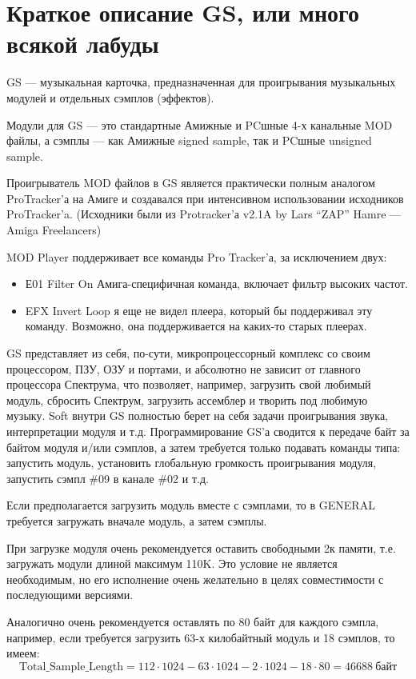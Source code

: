 \documentclass[a4paper,11pt]{article}
\begin{document}
\section{Краткое описание GS, или много всякой лабуды}
GS --- музыкальная карточка,  предназначенная для проигрывания  музыкальных модулей и отдельных сэмплов (эффектов).

Модули для GS --- это стандартные Амижные и PCшные 4-х канальные MOD файлы, а сэмплы --- как Амижные signed sample, так и PCшные unsigned sample.

Проигрыватель MOD  файлов  в  GS  является  практически  полным  аналогом ProTracker'а на Амиге и создавался при интенсивном  использовании  исходников ProTracker'a. (Исходники были из Protracker'а v2.1A by Lars ``ZAP'' Hamre --- Amiga Freelancers)

MOD Player поддерживает все команды Pro Tracker'а, за исключением двух:
\begin{itemize}
\item Е01 Filter On Амига-специфичная команда, включает фильтр высоких частот.
\item EFX Invert Loop я еще не видел плеера,  который бы поддерживал эту команду. Возможно, она поддерживается на каких-то старых плеерах.
\end{itemize}

GS представляет из себя,  по-сути,  микропроцессорный комплекс  со  своим процессором, ПЗУ, ОЗУ и портами, и абсолютно не зависит от главного процессора Спектрума,  что позволяет, например, загрузить свой любимый модуль, сбросить Спектрум,  загрузить ассемблер и творить под любимую музыку. Soft внутри GS полностью берет на себя задачи проигрывания звука, интерпретации модуля и т.д. Программирование GS'а сводится к передаче байт за байтом модуля и/или сэмплов,  а затем требуется только подавать команды типа: запустить модуль,  установить глобальную громкость проигрывания модуля, запустить сэмпл \#09 в канале \#02 и т.д.

Если предполагается загрузить модуль вместе с сэмплами, то в GENERAL требуется загружать вначале модуль, а затем сэмплы.

При загрузке модуля очень рекомендуется оставить свободными  2к памяти, т.е. загружать модули длиной максимум 110K. Это условие не является необходимым, но его исполнение очень желательно в целях совместимости с последующими версиями.

Аналогично очень рекомендуется оставлять по 80 байт для  каждого сэмпла, например, если требуется загрузить 63-х килобайтный модуль и 18 сэмплов, то имеем:
\[\mathrm{Total\_Sample\_Length}=112\cdotp1024-63\cdotp1024-2\cdotp1024-18\cdotp80=46688\  \mathrm{байт}\]
\end{document}
